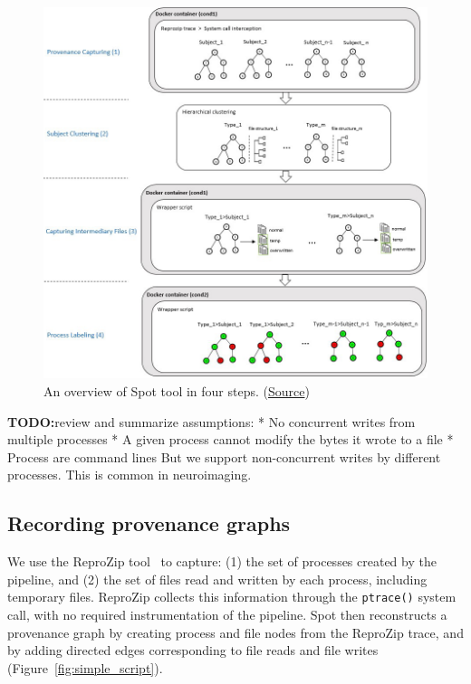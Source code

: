 \documentclass[a4paper,num-refs]{oup-contemporary}
\newcommand{\todo}[1]{\color{red}\textbf{TODO:}#1\color{black}}
\newcommand{\reprozip}[0]{ReproZip\xspace}
\newcommand{\toolname}[0]{Spot\xspace}
\begin{document}
\begin{figure}
  \centering
    \includegraphics[width=1\columnwidth]{images/overview-fig}
    \caption{An overview of Spot tool in four steps.
    (\href{https://encsconcordiaca-my.sharepoint.com/:p:/g/personal/m_alari_encs_concordia_ca/EYx_aIZgYKlDuuXKPKi5ckIBo_WmJeE1Czr9rqG4gLHOOA?e=H8gack}{Source})}
    \label{fig:overview-tool}
  \end{figure}


  \todo{review and summarize assumptions:
  * No concurrent writes from multiple processes
  * A given process cannot modify the bytes it wrote to a file
  * Process are command lines
  But we support non-concurrent writes by different processes. This is common in neuroimaging.
  }

\subsection{Recording provenance graphs}

We use the \reprozip tool~\cite{rampin2016reprozip}
to capture: (1) the set of processes created by the
pipeline, and
(2) the set of files read and written by each process, including
temporary files. \reprozip collects this information through the
\texttt{ptrace()} system call, with no required instrumentation of the pipeline.
\toolname then reconstructs a provenance graph by creating process and file
nodes from the \reprozip trace, and by adding directed edges corresponding
to file reads and file writes (Figure~\ref{fig:simple_script}). 
\end{document}
